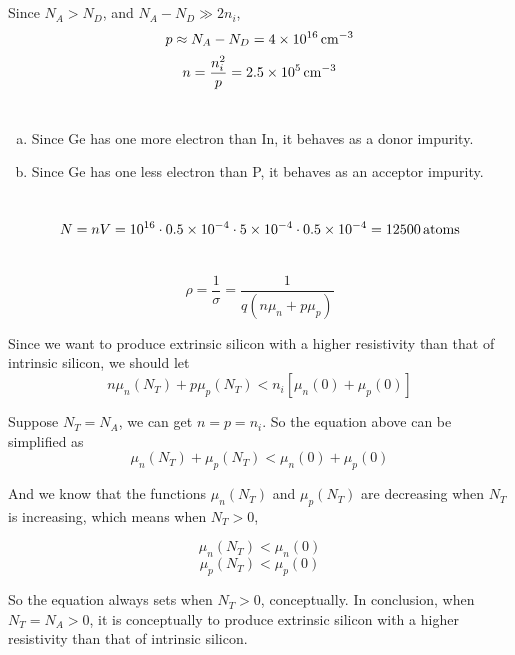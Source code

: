 \documentclass{article}
\newcommand{\unit}[1]{{\rm\,#1}}
\begin{document}
\section{}
Since $N_A>N_D$, and $N_A-N_D\gg 2n_i$,
$$p\approx N_A-N_D=4\times10^{16}\unit{cm^{-3}}$$
$$n=\frac{n_i^2}{p}=2.5\times10^{5}\unit{cm^{-3}}$$

\section{}
\begin{enumerate}[(a)]
\item Since Ge has one more electron than In, it behaves as a donor impurity.
\item Since Ge has one less electron than P, it behaves as an acceptor impurity.
\end{enumerate}

\section{}
$$N=nV=10^{16}\cdot0.5\times10^{-4}\cdot5\times10^{-4}\cdot0.5\times10^{-4}=12500\unit{atoms}$$

\section{}
$$\rho=\frac{1}{\sigma}=\frac{1}{q(n\mu_n+p\mu_p)}$$

Since we want to produce extrinsic silicon with a higher resistivity than that of intrinsic silicon, we should let
$$n\mu_n(N_T)+p\mu_p(N_T)<n_i[\mu_n(0)+\mu_p(0)]$$

Suppose $N_T=N_A$, we can get $n=p=n_i$. So the equation above can be simplified as
$$\mu_n(N_T)+\mu_p(N_T)<\mu_n(0)+\mu_p(0)$$

And we know that the functions $\mu_n(N_T)$ and $\mu_p(N_T)$ are decreasing when $N_T$ is increasing, which means when $N_T>0$,

$$\mu_n(N_T)<\mu_n(0)$$
$$\mu_p(N_T)<\mu_p(0)$$

So the equation always sets when $N_T>0$, conceptually. In conclusion, when $N_T=N_A>0$, it is conceptually to produce extrinsic silicon with a higher resistivity than that of intrinsic silicon.
\end{document}
